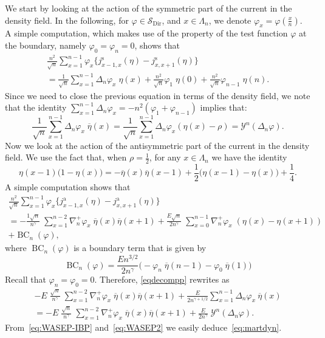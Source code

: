 \documentclass[AHL,Unicode,longabstracts]{cedram}
\DeclareMathOperator{\Dir}{Dir}
\DeclareMathOperator{\BC}{BC}
\newcommand*{\rms}{\mathrm{s}}
\newcommand*{\rma}{\mathrm{a}}
\newcommand{\mc}[1]{{\mathcal #1}}
\renewcommand{\mc}[1]{{\mathcal #1}}
\newcommand{\SD}{\ensuremath{\mc S_{\Dir}}}
\renewcommand{\bar}{\overline}
\begin{document}
We start by looking at the action of the symmetric part of the current in the density field. In the following, for $\varphi \in \SD$, and $x\in\Lambda_n$, we denote $\varphi_x=\varphi(\frac x n)$. A simple computation, which makes use of the property of the test function $\varphi$ at the boundary, namely $\varphi_0=\varphi_n=0$, shows that
\begin{multline}
\frac{n^2}{\sqrt n}\sum_{x=1}^{n-1}\varphi_x \big\{j_{x-1,x}^{\rms}(\eta)-j_{x,x+1}^{\rms}(\eta)\big\} \\
=\frac{1}{\sqrt n}\sum_{x=1}^{n-1}\Delta_n\varphi_x\;\eta(x)+ \frac{n^2}{\sqrt n}\varphi_1\;\eta(0)+\frac{n^2}{\sqrt n}\varphi_{n-1}\;\eta(n). \label{eq:eq}
\end{multline}
Since we need to close the previous equation in terms of the density field, we note that the identity $ \sum_{x=1}^{n-1}\Delta_n\varphi_x=-n^2(\varphi_1+\varphi_{n-1})$ implies that:
\begin{equation}\label{eq:WASEP-IBP}
\frac{1}{\sqrt n}\sum_{x=1}^{n-1}\Delta_n\varphi_x\;\bar\eta(x)=
\frac{1}{\sqrt n}\sum_{x=1}^{n-1}\Delta_n\varphi_x(\eta(x)-\rho)=\mathcal{Y}^n (\Delta_n\varphi).
\end{equation}
Now we look at the action of the antisymmetric part of the current in the density field. We use the fact that, when $\rho=\frac12$, for any $x\in\Lambda_n$ we have the identity
\begin{equation}
\eta(x-1)\big(1-\eta(x)\big)= - \bar\eta(x)\bar\eta(x-1) + \frac{1}{2}\big(\eta(x-1)-\eta(x)\big) + \frac{1}{4}.\label{eq:ide}
\end{equation}
A simple computation shows that
\begin{multline}
\frac{n^2}{\sqrt n}\sum_{x=1}^{n-1} \varphi_x \big\{j_{x-1,x}^{\rma}(\eta)-j_{x,x+1}^{\rma}(\eta)\big\}\label{eqdecompp}
\\ =-\frac{1\sqrt n}{n^{\gamma}}\; \sum_{x=1}^{n-2}\nabla_n^+\varphi_x\; \bar{\eta}(x)\bar{\eta}(x+1) + \frac{E\sqrt n}{2n^{\gamma}}\; \sum_{x=0}^{n-1}\nabla_n^+\varphi_x\;(\eta(x)-\eta(x+1))\\
+ \BC_n(\varphi),
\end{multline}
where $\BC_n(\varphi)$ is a boundary term that is given by
\[
\BC_n(\varphi) = \frac{En^{3/2}}{2n^{\gamma}} \Big(-\varphi_n\;\bar\eta(n-1) - \varphi_0\; \bar\eta(1)\Big)
\]
Recall that $\varphi_n=\varphi_0=0$. Therefore, \eqref{eqdecompp} rewrites as
\begin{multline}
-E \; \frac{\sqrt n}{n^\gamma}\; \sum_{x=1}^{n-2}\nabla_n^+\varphi_x\; \bar{\eta}(x)\bar{\eta}(x+1) + \frac{E}{2n^{\gamma+1/2}} \sum_{x=1}^{n-1}\Delta_n\varphi_x\:\bar\eta(x) \\
= -E \; \frac{\sqrt n}{n^\gamma}\; \sum_{x=1}^{n-2}\nabla_n^+\varphi_x\; \bar{\eta}(x)\bar{\eta}(x+1) + \frac{E}{2n^\gamma}\; \mc Y^n(\Delta_n \varphi).\label{eq:WASEP2}
\end{multline}
From~\eqref{eq:WASEP-IBP} and~\eqref{eq:WASEP2} we easily deduce~\eqref{eq:martdyn}.
\end{document}
